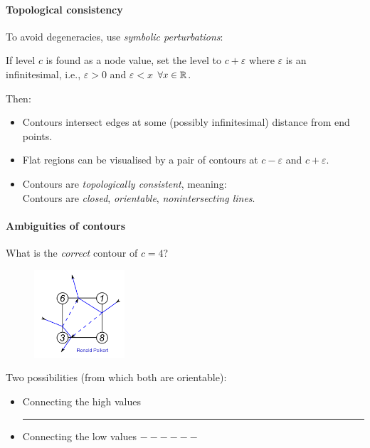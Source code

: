 \paragraph{Topological consistency}
To avoid degeneracies, use \emph{symbolic perturbations}:
\begin{description}
    \item If level $c$ is found as a node value, set the level to $c+\varepsilon$ where $\varepsilon$ is an infinitesimal, i.e., $\varepsilon >0$ and $\varepsilon < x$ $\forall x\in \mathbb{R}$.
\end{description}
Then:
\begin{itemize}
    \item Contours intersect edges at some (possibly infinitesimal) distance from end points.
    \item Flat regions can be visualised by a pair of contours at $c-\varepsilon$ and $c+\varepsilon$.
    \item Contours are \emph{topologically consistent}, meaning:\\
    
        Contours are \emph{closed}, \emph{orientable}, \emph{nonintersecting lines}.    
\end{itemize}

\paragraph{Ambiguities of contours} What is the \emph{correct} contour of $c=4$? 
\begin{figure}[H]
    \centering
    \includegraphics[width=0.3\textwidth]{img/02_contouring_c_4}
\end{figure}
Two possibilities (from which both are orientable):
\begin{itemize}
    \item Connecting the high values \rule{2cm}{0.9pt}
    \item Connecting the low values $- - - - - -$
\end{itemize}

